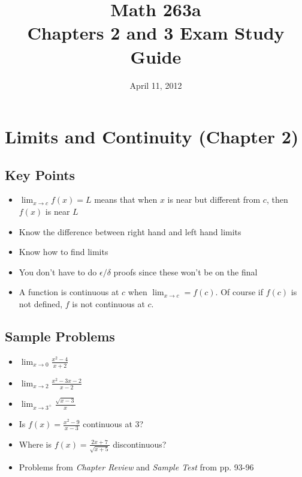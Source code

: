 \documentclass[fleqn]{exam}
\title{Math 263a \\ Chapters 2 and 3 Exam Study Guide}
\date{April 11, 2012}
\begin{document}
\maketitle


\section{Limits and Continuity (Chapter 2)}

\subsection{Key Points}
\begin{itemize}
\item $\lim_{x \to c} f(x) = L$ means that when $x$ is near but different from $c$, then $f(x)$ is near $L$
\item Know the difference between right hand and left hand limits
\item Know how to find limits
\item You don't have to do $\epsilon/\delta$ proofs since these won't be on the final
\item A function is continuous at $c$ when $\lim_{x \to c} = f(c)$.  Of course if $f(c)$ is not defined, $f$ is not
  continuous at $c$.
\end{itemize}

\subsection{Sample Problems}
\begin{itemize}
\item $\lim_{x \to 0} \frac{x^2 - 4}{x+2}$
\item $\lim_{x \to 2} \frac{x^2 - 3x - 2}{x-2}$
\item $\lim_{x \to 3^+} \frac{\sqrt{x-3}}{x}$
\item Is $f(x) = \frac{x^2 - 9}{x-3}$ continuous at 3?
\item Where is $f(x) = \frac{2x + 7}{\sqrt{x + 5}}$ discontinuous?
\item Problems from {\em Chapter Review} and {\em Sample Test} from pp. 93-96
\end{itemize}
\end{document}
